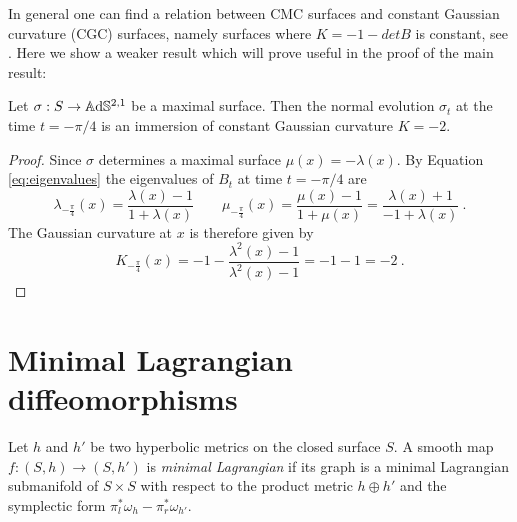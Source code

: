 In general one can find a relation between CMC surfaces and constant Gaussian curvature (CGC) surfaces, namely surfaces where $K = -1 - detB$ is constant, see \cite{chen2017constantmeancurvaturefoliation}. Here we show a weaker result which will prove useful in the proof of the main result:
\begin{proposition} \label{prop:cmc to cgc}
    Let $\sigma: S \to\mathbb{A}\mathrm{d}\mathbb{S}^{2,1}$ be a maximal surface. Then the normal evolution $\sigma_{t}$ at the time $t= -\pi / 4$ is an immersion of constant Gaussian curvature $K = -2$.
\end{proposition}
\begin{proof}
    Since $\sigma$ determines a maximal surface $\mu(x) = - \lambda(x)$. By Equation \ref{eq:eigenvalues} the eigenvalues of $B_t$ at time $t=-\pi / 4$ are
    \[
        \lambda_{-\frac{\pi}{4}}(x) = \frac{\lambda(x) -1}{1 +\lambda(x)} \qquad \mu_{-\frac{\pi}{4}}(x) = \frac{\mu(x)-1}{1 + \mu(x)} = \frac{\lambda(x) + 1}{-1 + \lambda(x)} \ .
    \]
    The Gaussian curvature at $x$ is therefore given by
    \[
        K_{-\frac{\pi}{4}}(x) = - 1 - \frac{ \lambda^2(x) -1}{ \lambda^2(x) -1 } = -1 -1 = -2 \ .
    \]
\end{proof}

\section{Minimal Lagrangian diffeomorphisms}

\begin{definition}
    Let $h$ and $h'$ be two hyperbolic metrics on the closed surface $S$. A smooth map $f: (S,h) \to (S,h')$ is \textit{minimal Lagrangian} if its graph is a minimal Lagrangian submanifold of $S\times S$ with respect to the product metric $h \oplus h'$ and the symplectic form $\pi_l^*\omega_h - \pi_r^* \omega_{h'}$. 
\end{definition}

